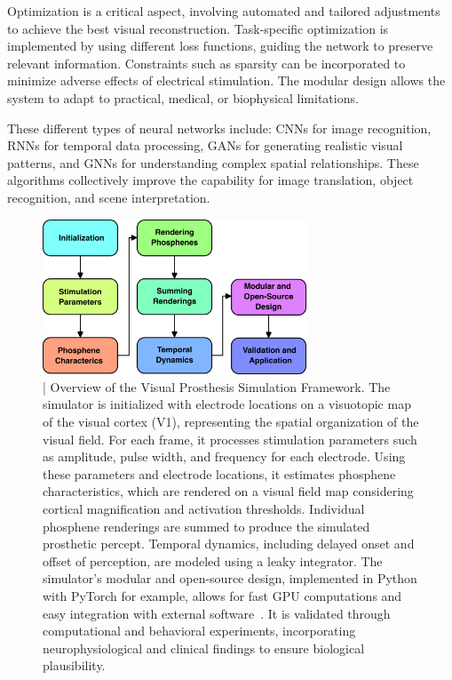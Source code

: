 \documentclass[twocolumn,10pt]{article}
\begin{document}
Optimization is a critical aspect, involving automated and tailored adjustments
to achieve the best visual reconstruction. Task-specific optimization is
implemented by using different loss functions, guiding the network to preserve
relevant information. Constraints such as sparsity can be incorporated to
minimize adverse effects of electrical stimulation. The modular design allows
the system to adapt to practical, medical, or biophysical limitations.

These different types of neural networks include: CNNs for image recognition,
RNNs for temporal data processing, GANs for generating realistic visual
patterns, and GNNs for understanding complex spatial relationships. These
algorithms collectively improve the capability for image translation, object
recognition, and scene interpretation.

\begin{figure}[hbt!]
      \centering
      \includegraphics[width=0.7\textwidth]{imgs/block_diagram_vis_prost.png}
      \caption{| Overview of the Visual Prosthesis Simulation Framework. The
            simulator is initialized with electrode locations on a visuotopic
            map of the visual cortex (V1), representing the spatial organization
            of the visual field. For each frame, it processes stimulation
            parameters such as amplitude, pulse width, and frequency for each
            electrode. Using these parameters and electrode locations, it
            estimates phosphene characteristics, which are rendered on a visual
            field map considering cortical magnification and activation
            thresholds. Individual phosphene renderings are summed to produce
            the simulated prosthetic percept. Temporal dynamics, including
            delayed onset and offset of perception, are modeled using a leaky
            integrator. The simulator's modular and open-source design,
            implemented in Python with PyTorch for example, allows for fast GPU
            computations and easy integration with external
            software~\parencite{deruytervansteveninckEndtoendOptimizationProsthetic2022}.
            It is validated through computational and behavioral experiments,
            incorporating neurophysiological and clinical findings to ensure
            biological plausibility.}\label{fig:simulator_framework}
\end{figure}
\end{document}
